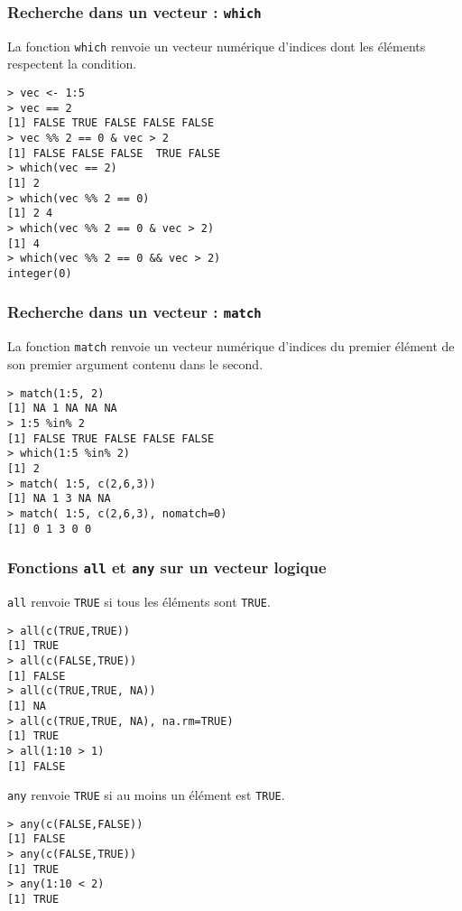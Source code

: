 \documentclass[10pt]{beamer}
\begin{document}
\begin{frame}[fragile]
  \frametitle{Recherche dans un vecteur : \texttt{which}}
  La fonction \texttt{which} renvoie un vecteur numérique d'indices dont les éléments respectent la condition.
  \begin{lstlisting}
> vec <- 1:5
> vec == 2
[1] FALSE TRUE FALSE FALSE FALSE
> vec %% 2 == 0 & vec > 2
[1] FALSE FALSE FALSE  TRUE FALSE
> which(vec == 2)
[1] 2
> which(vec %% 2 == 0)
[1] 2 4
> which(vec %% 2 == 0 & vec > 2)
[1] 4
> which(vec %% 2 == 0 && vec > 2)
integer(0)    
\end{lstlisting}
\end{frame}





\begin{frame}[fragile]
  \frametitle{Recherche dans un vecteur : \texttt{match}}
  La fonction \texttt{match} renvoie un vecteur numérique d'indices du premier élément de son premier argument contenu dans le second.
  \begin{lstlisting}
> match(1:5, 2)
[1] NA 1 NA NA NA
> 1:5 %in% 2
[1] FALSE TRUE FALSE FALSE FALSE
> which(1:5 %in% 2)
[1] 2
> match( 1:5, c(2,6,3))
[1] NA 1 3 NA NA
> match( 1:5, c(2,6,3), nomatch=0)
[1] 0 1 3 0 0
  \end{lstlisting}
\end{frame}


\begin{frame}[fragile]
  \frametitle{Fonctions \texttt{all} et \texttt{any} sur un vecteur logique}

  \begin{block}{\texttt{all} renvoie \texttt{TRUE} si tous les éléments sont \texttt{TRUE}.}
  \begin{lstlisting}[style=block]
> all(c(TRUE,TRUE))
[1] TRUE
> all(c(FALSE,TRUE))
[1] FALSE
> all(c(TRUE,TRUE, NA))
[1] NA
> all(c(TRUE,TRUE, NA), na.rm=TRUE)
[1] TRUE
> all(1:10 > 1)
[1] FALSE
\end{lstlisting}
  \end{block}

  \begin{block}{\texttt{any} renvoie \texttt{TRUE} si au moins un élément est \texttt{TRUE}.}
  \begin{lstlisting}[style=block]
> any(c(FALSE,FALSE))
[1] FALSE
> any(c(FALSE,TRUE))
[1] TRUE
> any(1:10 < 2)
[1] TRUE
\end{lstlisting}
  \end{block}

\end{frame}
\end{document}
